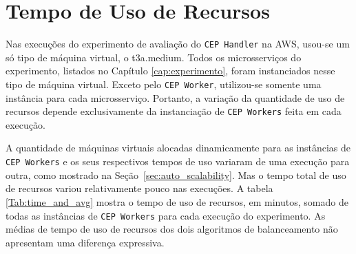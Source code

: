 

\section{Tempo de Uso de Recursos}
\label{sec:resource_usage_time}



Nas execuções do experimento de avaliação do \texttt{CEP Handler} na AWS, usou-se um só tipo de máquina virtual, o t3a.medium. Todos os microsserviços do experimento, listados no Capítulo \ref{cap:experimento}, foram instanciados nesse tipo de máquina virtual. Exceto pelo \texttt{CEP Worker}, utilizou-se somente uma instância para cada microsserviço. Portanto, a variação da quantidade de uso de recursos depende exclusivamente da instanciação de \texttt{CEP Workers} feita em cada execução.

A quantidade de máquinas virtuais alocadas dinamicamente para as instâncias de \texttt{CEP Workers} e os seus respectivos tempos de uso variaram de uma execução para outra, como mostrado na Seção~\ref{sec:auto_scalability}.
Mas o tempo total de uso de recursos variou relativamente pouco nas execuções.
A tabela \ref{Tab:time_and_avg} mostra o tempo de uso de recursos, em minutos, somado de todas as instâncias de \texttt{CEP Workers} para cada execução do experimento. As médias de tempo de uso de recursos dos dois algoritmos de balanceamento não apresentam uma diferença expressiva.

